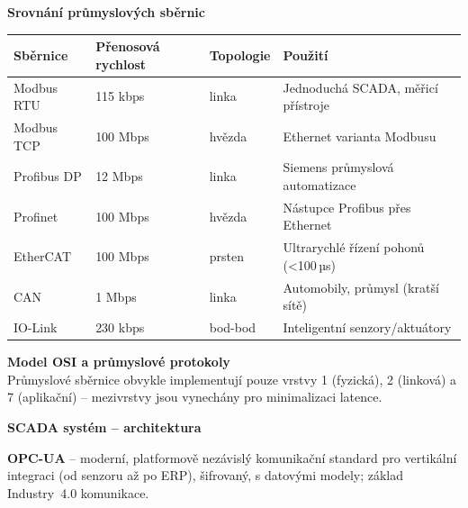 \documentclass[a4paper,10pt]{article}
\begin{document}
\begin{vysvetlenibox}
\textbf{Srovnání průmyslových sběrnic}

\begin{center}
\begin{tabularx}{0.95\linewidth}{@{} l l l X @{}}
    \toprule
    \textbf{Sběrnice} & \textbf{Přenosová rychlost}
                      & \textbf{Topologie} & \textbf{Použití} \\
    \midrule
    Modbus RTU  & 115 kbps   & linka     & Jednoduchá SCADA, měřicí přístroje \\
    Modbus TCP  & 100 Mbps   & hvězda    & Ethernet varianta Modbusu \\
    Profibus DP & 12 Mbps    & linka     & Siemens průmyslová automatizace \\
    Profinet    & 100 Mbps   & hvězda    & Nástupce Profibus přes Ethernet \\
    EtherCAT    & 100 Mbps   & prsten    & Ultrarychlé řízení pohonů (\textless{}100\,µs) \\
    CAN         & 1 Mbps     & linka     & Automobily, průmysl (kratší sítě) \\
    IO-Link     & 230 kbps   & bod-bod   & Inteligentní senzory/aktuátory \\
    \bottomrule
\end{tabularx}
\end{center}

\textbf{Model OSI a průmyslové protokoly}\\
Průmyslové sběrnice obvykle implementují pouze vrstvy 1 (fyzická),
2 (linková) a 7 (aplikační) -- mezivrstvy jsou vynechány pro minimalizaci
latence.

\textbf{SCADA systém -- architektura}

\begin{center}
\end{center}

\textbf{OPC-UA} -- moderní, platformově nezávislý komunikační standard
pro vertikální integraci (od senzoru až po ERP), šifrovaný, s datovými
modely; základ Industry~4.0 komunikace.
\end{vysvetlenibox}


\end{document}
